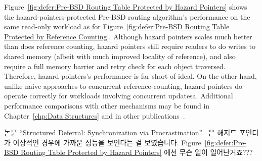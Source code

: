 Figure~\ref{fig:defer:Pre-BSD Routing Table Protected by Hazard Pointers}
shows the hazard-pointers-protected Pre-BSD routing algorithm's
performance on the same read-only workload as for
Figure~\ref{fig:defer:Pre-BSD Routing Table Protected by Reference Counting}.
Although hazard pointers scales much better than does reference counting,
hazard pointers still require readers to do writes to shared
memory (albeit with much improved locality of reference),
and also require a full memory barrier and retry check for each
object traversed.
Therefore, hazard pointers's performance is far short of ideal.
On the other hand, unlike naive approaches to concurrent reference-counting,
hazard pointers do operate correctly for workloads
involving concurrent updatesa.
Additional performance comparisons with other mechanisms may be found in
Chapter~\ref{chp:Data Structures}
and in other publications~\cite{ThomasEHart2007a,McKenney:2013:SDS:2483852.2483867,MagedMichael04a}.
\fi

\QuickQuiz{}
	논문 ``Structured Deferral: Synchronization via
	Procrastination''~\cite{McKenney:2013:SDS:2483852.2483867} 은 해저드
	포인터가 이상적인 경우에 가까운 성능을 보인다는 걸 보였습니다.
	Figure~\ref{fig:defer:Pre-BSD Routing Table Protected by Hazard Pointers}
	에선 무슨 일이 일어난거죠???
	\iffalse

